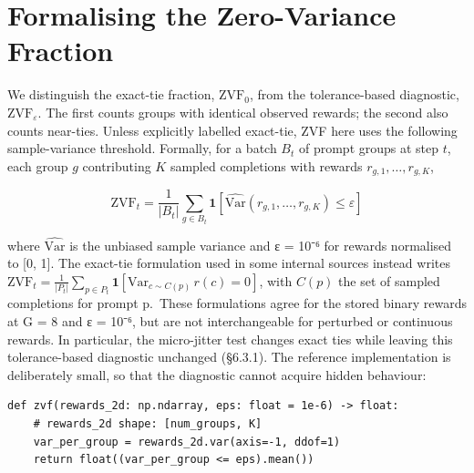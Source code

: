 \documentclass[12pt,a4paper]{report}
\begin{document}
\section{Formalising the Zero-Variance
Fraction}\label{formalising-the-zero-variance-fraction}

We distinguish the exact-tie fraction, \(\mathrm{ZVF}_0\), from the
tolerance-based diagnostic, \(\mathrm{ZVF}_{\varepsilon}\). The first
counts groups with identical observed rewards; the second also counts
near-ties. Unless explicitly labelled exact-tie, ZVF here uses the
following sample-variance threshold. Formally, for a batch \(B_t\) of
prompt groups at step \(t\), each group \(g\) contributing \(K\) sampled
completions with rewards \(r_{g,1}, \ldots, r_{g,K}\),

\[\mathrm{ZVF}_t = \frac{1}{|B_t|} \sum_{g \in B_t} \mathbf{1}\!\left[\widehat{\mathrm{Var}}(r_{g,1}, \ldots, r_{g,K}) \le \varepsilon\right]\]

where \(\widehat{\mathrm{Var}}\) is the unbiased sample variance and ε =
10⁻⁶ for rewards normalised to {[}0, 1{]}. The exact-tie formulation
used in some internal sources instead writes
\(\mathrm{ZVF}_t = \frac{1}{|P_t|} \sum_{p \in P_t} \mathbf{1}[\mathrm{Var}_{c \sim C(p)}\, r(c) = 0]\),
with \(C(p)\) the set of sampled completions for prompt p.~These
formulations agree for the stored binary rewards at G = 8 and ε = 10⁻⁶,
but are not interchangeable for perturbed or continuous rewards. In
particular, the micro-jitter test changes exact ties while leaving this
tolerance-based diagnostic unchanged (§6.3.1). The reference
implementation is deliberately small, so that the diagnostic cannot
acquire hidden behaviour:

\begin{verbatim}
def zvf(rewards_2d: np.ndarray, eps: float = 1e-6) -> float:
    # rewards_2d shape: [num_groups, K]
    var_per_group = rewards_2d.var(axis=-1, ddof=1)
    return float((var_per_group <= eps).mean())
\end{verbatim}
\end{document}
